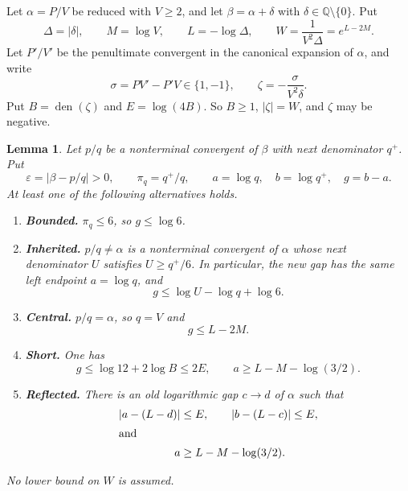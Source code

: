 \documentclass{amsart}
\newtheorem{lemma}{Lemma}[section]
\numberwithin{equation}{section}
\newcommand{\Q}{\mathbb Q}
\newcommand{\den}{\operatorname{den}}
\begin{document}
Let $\alpha=P/V$ be reduced with $V\ge2$, and let
$\beta=\alpha+\delta$ with $\delta\in\Q\setminus\{0\}$.
Put
\begin{equation}\label{eq:perturbparameters}
\Delta=|\delta|,\qquad M=\log V,\qquad L=-\log\Delta,
\qquad W=\frac1{V^2\Delta}=e^{L-2M}.
\end{equation}
Let $P'/V'$ be the penultimate convergent in the canonical expansion
of $\alpha$, and write
\begin{equation}\label{eq:inversecoordinate}
\sigma=PV'-P'V\in\{1,-1\},\qquad
\zeta=-\frac{\sigma}{V^2\delta}.
\end{equation}
Put $B=\den(\zeta)$ and $E=\log(4B)$. So $B\ge1$, $|\zeta|=W$, and
$\zeta$ may be negative.

\begin{lemma}\label{lem:perturbation}
Let $p/q$ be a nonterminal convergent of $\beta$ with next denominator
$q^+$. Put
\[
\varepsilon=|\beta-p/q|>0,\qquad \pi_q=q^+/q,\qquad
a=\log q,\quad b=\log q^+,\quad g=b-a.
\]
At least one of the following alternatives holds.
\begin{enumerate}
\item \textbf{Bounded.} $\pi_q\le6$, so $g\le\log6$.
\item \textbf{Inherited.} $p/q\ne\alpha$ is a nonterminal convergent of $\alpha$ whose next
denominator $U$ satisfies $U\ge q^+/6$. In particular,
the new gap has the same left endpoint $a=\log q$, and
\begin{equation}\label{eq:inherited}
g\le\log U-\log q+\log6.
\end{equation}
\item \textbf{Central.} $p/q=\alpha$, so $q=V$ and
\begin{equation}\label{eq:central}
g\le L-2M.
\end{equation}
\item \textbf{Short.} One has
\begin{equation}\label{eq:short}
g\le\log12+2\log B\le2E,\qquad
a\ge L-M-\log(3/2).
\end{equation}
\item \textbf{Reflected.} There is an old logarithmic gap $c\to d$ of $\alpha$ such that
\begin{align}
|a-(L-d)|&\le E,\qquad |b-(L-c)|\le E,\label{eq:reflected}\\
\intertext{and}
a&\ge L-M-\log(3/2).\label{eq:reflectedlocation}
\end{align}
\end{enumerate}
No lower bound on $W$ is assumed.
\end{lemma}
\end{document}

